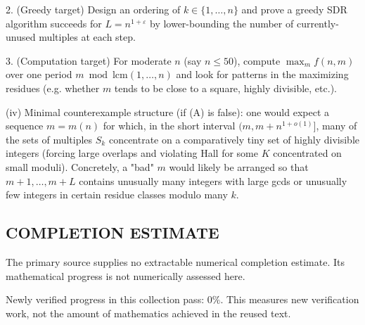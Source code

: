 2. (Greedy target) Design an ordering of $k\in\{1,\dots,n\}$ and prove a greedy SDR algorithm succeeds for $L=n^{1+\varepsilon}$ by lower-bounding the number of currently-unused multiples at each step.

3. (Computation target) For moderate $n$ (say $n\le 50$), compute $\max_m f(n,m)$ over one period $m\bmod\mathrm{lcm}(1,\dots,n)$ and look for patterns in the maximizing residues (e.g. whether $m$ tends to be close to a square, highly divisible, etc.).

(iv) Minimal counterexample structure (if (A) is false): one would expect a sequence $m=m(n)$ for which, in the short interval $(m,m+n^{1+o(1)}]$, many of the sets of multiples $S_k$ concentrate on a comparatively tiny set of highly divisible integers (forcing large overlaps and violating Hall for some $K$ concentrated on small moduli). Concretely, a "bad" $m$ would likely be arranged so that $m+1,\dots,m+L$ contains unusually many integers with large gcds or unusually few integers in certain residue classes modulo many $k$.




\subsection*{COMPLETION ESTIMATE}
The primary source supplies no extractable numerical completion estimate. Its mathematical progress is not numerically assessed here.

Newly verified progress in this collection pass: $0\%$. This measures new verification work, not the amount of mathematics achieved in the reused text.
